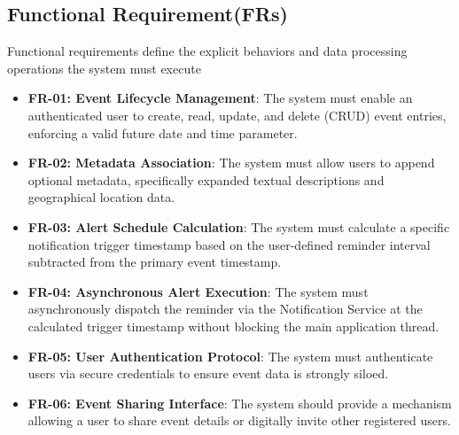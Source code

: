 \subsection{Functional Requirement(FRs)}
Functional requirements define the explicit behaviors and data processing operations the system must execute
\begin{itemize}[leftmargin=*]
    \item \textbf{FR-01: Event Lifecycle Management}: The system must enable an authenticated user to create, read, update, and delete (CRUD) event entries, enforcing a valid future date and time parameter.


    \item \textbf{FR-02: Metadata Association}: The system must allow users to append optional metadata, specifically expanded textual descriptions and geographical location data.


    \item \textbf{FR-03: Alert Schedule Calculation}: The system must calculate a specific notification trigger timestamp based on the user-defined reminder interval subtracted from the primary event timestamp.


    \item \textbf{FR-04: Asynchronous Alert Execution}: The system must asynchronously dispatch the reminder via the Notification Service at the calculated trigger timestamp without blocking the main application thread.


    \item \textbf{FR-05: User Authentication Protocol}: The system must authenticate users via secure credentials to ensure event data is strongly siloed.


    \item \textbf{FR-06: Event Sharing Interface}: The system should provide a mechanism allowing a user to share event details or digitally invite other registered users.
\end{itemize}
